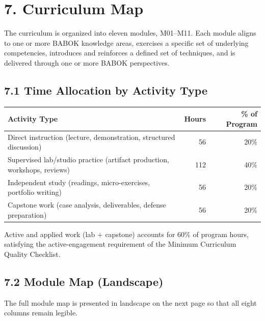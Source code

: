 \documentclass[11pt,letterpaper,oneside]{report}
\begin{document}

\section*{7. Curriculum Map}
The curriculum is organized into eleven modules, M01--M11. Each module aligns to one or more BABOK knowledge areas, exercises a specific set of underlying competencies, introduces and reinforces a defined set of techniques, and is delivered through one or more BABOK perspectives.

\subsection*{7.1 Time Allocation by Activity Type}

\begin{tcolorbox}[callout,colback=afpaper,colframe=afnavy,colbacktitle=afnavy,title=Time Allocation Across the Program]
\begin{tabular}{@{}R{8.0cm} r r@{}}
\toprule
\sffamily\bfseries Activity Type & \sffamily\bfseries Hours & \sffamily\bfseries \% of Program \\
\midrule
Direct instruction (lecture, demonstration, structured discussion)         &  56 & 20\% \\
Supervised lab/studio practice (artifact production, workshops, reviews)   & 112 & 40\% \\
Independent study (readings, micro-exercises, portfolio writing)           &  56 & 20\% \\
Capstone work (case analysis, deliverables, defense preparation)           &  56 & 20\% \\
\bottomrule
\end{tabular}
\end{tcolorbox}

Active and applied work (lab + capstone) accounts for 60\% of program hours, satisfying the active-engagement requirement of the Minimum Curriculum Quality Checklist.

\subsection*{7.2 Module Map (Landscape)}
The full module map is presented in landscape on the next page so that all eight columns remain legible.
\end{document}
